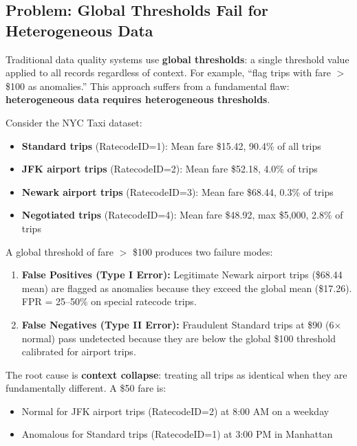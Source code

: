 \subsection{Problem: Global Thresholds Fail for Heterogeneous Data}

Traditional data quality systems use \textbf{global thresholds}: a single threshold value applied to all records regardless of context. For example, ``flag trips with fare $>$ \$100 as anomalies.'' This approach suffers from a fundamental flaw: \textbf{heterogeneous data requires heterogeneous thresholds}.

Consider the NYC Taxi dataset:

\begin{itemize}
    \item \textbf{Standard trips} (RatecodeID=1): Mean fare \$15.42, 90.4\% of all trips
    \item \textbf{JFK airport trips} (RatecodeID=2): Mean fare \$52.18, 4.0\% of trips
    \item \textbf{Newark airport trips} (RatecodeID=3): Mean fare \$68.44, 0.3\% of trips
    \item \textbf{Negotiated trips} (RatecodeID=4): Mean fare \$48.92, max \$5,000, 2.8\% of trips
\end{itemize}

A global threshold of fare $>$ \$100 produces two failure modes:

\begin{enumerate}
    \item \textbf{False Positives (Type I Error):} Legitimate Newark airport trips (\$68.44 mean) are flagged as anomalies because they exceed the global mean (\$17.26). FPR = 25--50\% on special ratecode trips.

    \item \textbf{False Negatives (Type II Error):} Fraudulent Standard trips at \$90 (6$\times$ normal) pass undetected because they are below the global \$100 threshold calibrated for airport trips.
\end{enumerate}

The root cause is \textbf{context collapse}: treating all trips as identical when they are fundamentally different. A \$50 fare is:
\begin{itemize}
    \item Normal for JFK airport trips (RatecodeID=2) at 8:00 AM on a weekday
    \item Anomalous for Standard trips (RatecodeID=1) at 3:00 PM in Manhattan
\end{itemize}

